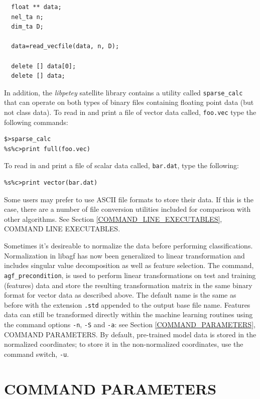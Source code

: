\documentclass[12pt]{article}
\begin{document}
\begin{verbatim}
  float ** data;
  nel_ta n;
  dim_ta D;

  data=read_vecfile(data, n, D);

  delete [] data[0];
  delete [] data;
\end{verbatim}

In addition, the {\it libpetey} satellite library contains a utility called \verb/sparse_calc/ that can operate on both types of binary files containing floating point data (but not class data).  To read in and print a file of vector data called, \verb"foo.vec" type the following commands:

\begin{verbatim}
$>sparse_calc
%s%c>print full(foo.vec)
\end{verbatim}

To read in and print a file of scalar data called, \verb"bar.dat", type the following:

\begin{verbatim}
%s%c>print vector(bar.dat)
\end{verbatim}

Some users may prefer to use ASCII file formats to store their data.  If this is the case, there are a number of file conversion utilities included for comparison with other algorithms.  See Section \ref{COMMAND_LINE_EXECUTABLES}, COMMAND LINE EXECUTABLES.

Sometimes it's desireable to normalize the data before performing classifications.  Normalization in libagf has now been generalized to linear transformation and includes singular value decomposition as well as feature selection.  The command, \verb"agf_precondition", is used to perform linear transformations on test and training (features) data and store the resulting transformation matrix in the same binary format for vector data as described above.  The default name is the same as before with the extension \verb".std" appended to the output base file name.  Features data can still be transformed directly within the machine learning routines using the command options \verb"-n", \verb"-S" and \verb"-a": see Section \ref{COMMAND_PARAMETERS}, COMMAND PARAMETERS.  By default, pre-trained model data is stored in the normalized coordinates; to store it in the non-normalized coordinates, use the command switch, \verb"-u".

\section{COMMAND PARAMETERS}
\end{document}
